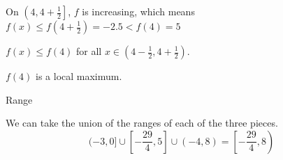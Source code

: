 \documentclass{ximera}
\begin{document}
\begin{exercise}
\begin{question}
On $\left( 4, 4 + \frac{1}{2} \right]$, $f$ is increasing, which means $f(x) \leq f\left( 4 + \frac{1}{2} \right) = -2.5 < f(4) = 5$


$f(x) \leq f(4)$  for all $x \in \left( 4-\frac{1}{2}, 4 + \frac{1}{2} \right)$.

$f(4)$ is a local maximum.



\end{question}




\begin{question} Range 


We can take the union of the ranges of each of the three pieces.\\


\[
(-3, 0] \cup \left[ -\frac{29}{4}, 5 \right] \cup (-4, 8) = \left[ -\frac{29}{4}, 8 \right)
\]


\end{question}





\end{exercise}
\end{document}

